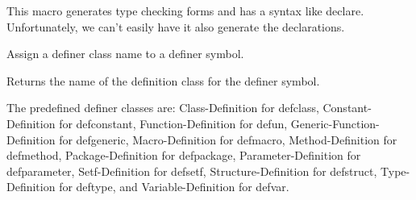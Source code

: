\beginDefinition


\beginDocumentation
This macro generates type checking forms and has a syntax like \<declare\>.
Unfortunately, we can't easily have it also generate the declarations.\endDocumentation
{}\endUsage

\endDefinition


\beginDefinition


\beginDocumentation
Assign a definer class name to a definer symbol.\endDocumentation
{}\endUsage

\endDefinition


\beginDefinition


\beginDocumentation
Returns the name of the definition class for the \<definer\> symbol.

The predefined definer classes are: 
Class-Definition for defclass,
Constant-Definition for defconstant,
Function-Definition for defun,
Generic-Function-Definition for defgeneric,
Macro-Definition for defmacro,
Method-Definition for defmethod,
Package-Definition for defpackage,
Parameter-Definition for defparameter,
Setf-Definition for defsetf,
Structure-Definition for defstruct,
Type-Definition for deftype,
and
Variable-Definition for defvar.\endDocumentation
{}\endUsage
\beginArguments
{}\endArg
\endArguments
\beginReturn
\singleReturn {}\endcReturn
\endReturn

\endDefinition


\beginDefinition


